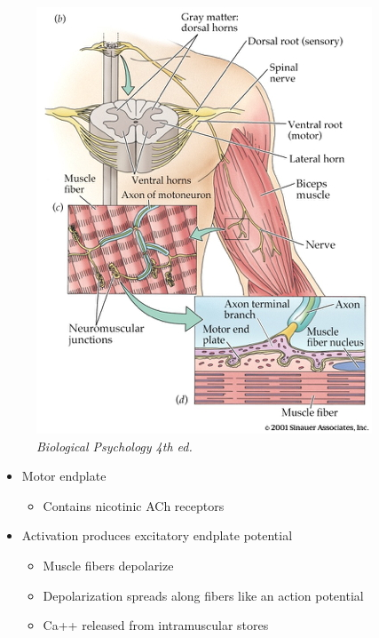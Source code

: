 \documentclass[
  letterpaper,
  DIV=11,
  numbers=noendperiod]{scrartcl}
\providecommand{\tightlist}{%
  \setlength{\itemsep}{0pt}\setlength{\parskip}{0pt}}\usepackage{longtable,booktabs,array}
\begin{document}
\begin{figure}[H]

{\centering \includegraphics{../include/img/from-spinal-cord-to-muscle.jpg}

}

\caption{\emph{Biological Psychology 4th ed.}}

\end{figure}%

\begin{itemize}
\tightlist
\item
  Motor endplate

  \begin{itemize}
  \tightlist
  \item
    Contains nicotinic ACh receptors
  \end{itemize}
\item
  Activation produces excitatory endplate potential

  \begin{itemize}
  \tightlist
  \item
    Muscle fibers depolarize
  \item
    Depolarization spreads along fibers like an action potential
  \item
    Ca++ released from intramuscular stores
  \end{itemize}
\end{itemize}
\end{document}
